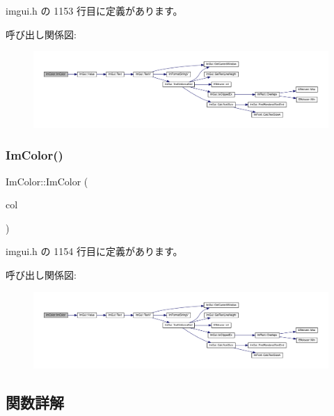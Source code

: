  imgui.\+h の 1153 行目に定義があります。

呼び出し関係図\+:\nopagebreak
\begin{figure}[H]
\begin{center}
\leavevmode
\includegraphics[width=350pt]{struct_im_color_a92b53917ca9d90a7207b18270ff5453d_cgraph}
\end{center}
\end{figure}
\mbox{\label{struct_im_color_aa5306926b3ef766a8647b26bdfd9f8d2}} 
\subsubsection{\texorpdfstring{Im\+Color()}{ImColor()}\hspace{0.1cm}{\footnotesize\ttfamily [5/5]}}
{\footnotesize\ttfamily Im\+Color\+::\+Im\+Color (\begin{DoxyParamCaption}\item[{const \mbox{\hyperlink{struct_im_vec4}{Im\+Vec4}} \&}]{col }\end{DoxyParamCaption})\hspace{0.3cm}{\ttfamily [inline]}}



 imgui.\+h の 1154 行目に定義があります。

呼び出し関係図\+:\nopagebreak
\begin{figure}[H]
\begin{center}
\leavevmode
\includegraphics[width=350pt]{struct_im_color_aa5306926b3ef766a8647b26bdfd9f8d2_cgraph}
\end{center}
\end{figure}


\subsection{関数詳解}
\mbox{\label{struct_im_color_ac8cb52119648523038818a613becf010}} 
